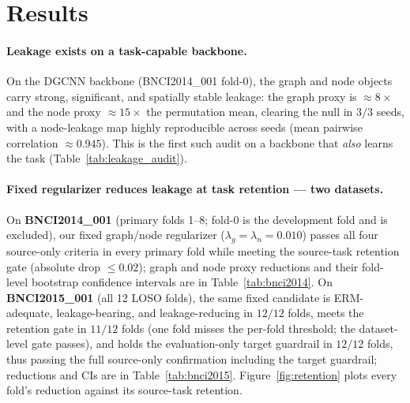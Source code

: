 \section{Results}
\label{sec:results}

\paragraph{Leakage exists on a task-capable backbone.} On the DGCNN backbone (BNCI2014\_001 fold-0), the
graph and node objects carry strong, significant, and spatially stable leakage: the graph proxy is
$\approx 8\times$ and the node proxy $\approx 15\times$ the permutation mean, clearing the null in $3/3$
seeds, with a node-leakage map highly reproducible across seeds (mean pairwise correlation $\approx 0.945$).
This is the first such audit on a backbone that \emph{also} learns the task (Table~\ref{tab:leakage_audit}).



\paragraph{Fixed regularizer reduces leakage at task retention --- two datasets.} On \textbf{BNCI2014\_001}
(primary folds 1--8; fold-0 is the development fold and is excluded), our fixed graph/node regularizer
($\lambda_g=\lambda_n=0.010$) passes all four source-only criteria in every primary fold while meeting the
source-task retention gate
(absolute drop $\le 0.02$); graph and node proxy reductions and their fold-level bootstrap confidence
intervals are in Table~\ref{tab:bnci2014}. On \textbf{BNCI2015\_001} (all 12 LOSO folds), the same fixed candidate is
ERM-adequate, leakage-bearing, and leakage-reducing in $12/12$ folds, meets the retention gate in $11/12$
folds (one fold misses the per-fold threshold; the dataset-level gate passes), and holds the
evaluation-only target guardrail in $12/12$ folds, thus passing the full source-only confirmation including
the target guardrail; reductions and CIs are in Table~\ref{tab:bnci2015}. Figure~\ref{fig:retention} plots every fold's reduction against its source-task
retention.




